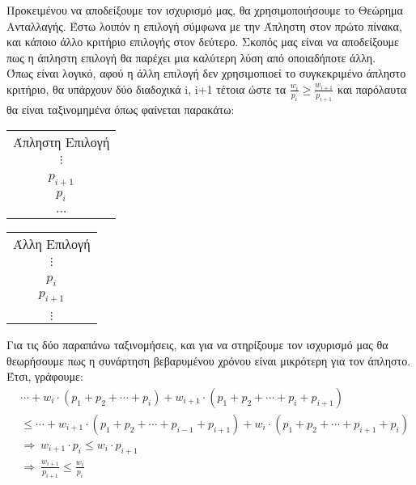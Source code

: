 \documentclass{article}
\begin{document}
\begin{enumerate}
Προκειμένου να αποδείξουμε τον ισχυρισμό μας, θα χρησιμοποιήσουμε το Θεώρημα Ανταλλαγής. Έστω λοιπόν η επιλογή σύμφωνα με την Άπληστη στον πρώτο πίνακα, και κάποιο άλλο κριτήριο επιλογής στον δεύτερο. Σκοπός μας είναι να αποδείξουμε πως η άπληστη επιλογή θα παρέχει μια καλύτερη λύση από οποιαδήποτε άλλη. 
\\Όπως είναι λογικό, αφού η άλλη επιλογή δεν χρησιμοπιοεί το συγκεκριμένο άπληστο κριτήριο, θα υπάρχουν δύο διαδοχικά i, i+1 τέτοια ώστε τα $\frac{w_i}{p_i}  \geq \frac{w_{i+1}}{p_{i+1}}$ και παρόλαυτα θα είναι ταξινομημένα όπως φαίνεται παρακάτω:
\begin{center}
\begin{minipage}{0.05\textwidth}
  \centering
  \begin{tabular}{|c|}
    \hline
    Άπληστη Επιλογή \\
    $\vdots$ \\
    \rule{0pt}{15pt} \\ %
    \hline
    $p_{i+1}$ \\
    \hline
    $p_{i}$ \\
    \hline
    \rule{0pt}{15pt} \\ %
    $\cdots$ \\
    \hline
  \end{tabular}
\end{minipage}
\hspace{1cm}
\begin{minipage}{0.4\textwidth}
  \centering
  \begin{tabular}{|c|}
    \hline
    Άλλη Επιλογή \\
    $\vdots$ \\
    \rule{0pt}{15pt} \\ %
    \hline
    $p_{i}$ \\
    \hline
    $p_{i+1}$ \\
    \hline
    \rule{0pt}{15pt} \\ %
    $\vdots$ \\
    \hline
  \end{tabular}
\end{minipage}
\end{center}

Για τις δύο παραπάνω ταξινομήσεις, και για να στηρίξουμε τον ισχυρισμό μας θα θεωρήσουμε πως η συνάρτηση βεβαρυμένου χρόνου είναι μικρότερη για τον άπληστο. Έτσι, γράφουμε:
\begin{align*}
&\cdots + w_i \cdot (p_1 + p_2 + \cdots + p_i) + w_{i+1} \cdot (p_1 + p_2 + \cdots + p_i + p_{i+1}) \\
&\leq \cdots + w_{i+1} \cdot (p_1 + p_2 + \cdots + p_{i-1} + p_{i+1}) + w_i \cdot (p_1 + p_2 + \cdots + p_{i+1} + p_i) \\
&\Rightarrow\ w_{i+1} \cdot p_i \leq  w_i \cdot p_{i+1}\\
&\Rightarrow\ \frac{w_{i+1}}{p_{i+1}} \leq \frac{w_i}{p_i}
\end{align*}


\end{enumerate}
\end{document}
